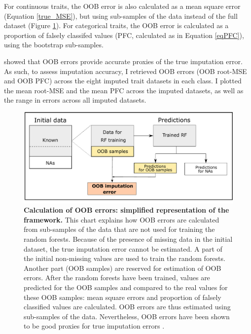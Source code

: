 For continuous traits, the OOB error is also calculated as a mean square error (Equation \ref{true_MSE}), but using sub-samples of the data instead of the full dataset (Figure \ref{OOBerrors_chart}). For categorical traits, the OOB error is calculated as a proportion of falsely classifed values (PFC, calculated as in Equation \ref{eqPFC}), using the bootstrap sub-samples. 

\citet{Breiman2001} showed that OOB errors provide accurate proxies of the true imputation error. As such, to assess imputation accuracy, I retrieved OOB errors (OOB root-MSE and OOB PFC) across the eight imputed trait datasets in each class. I plotted the mean root-MSE and the mean PFC across the imputed datasets, as well as the range in errors across all imputed datasets.

\begin{figure}[h!]
\centering
\includegraphics[scale=0.6]{figures/chapter2/OOBerror/OOB_error_chart}
\caption[Calculation of OOB errors: simplified representation of the framework]{\textbf{Calculation of OOB errors: simplified representation of the  framework.} This chart explains how OOB errors are calculated from sub-samples of the data that are not used for training the random forests. Because of the presence of missing data in the initial dataset, the true imputation error cannot be estimated. A part of the initial non-missing values are used to train the random forests. Another part (OOB samples) are reserved for estimation of OOB errors. After the random forests have been trained, values are predicted for the OOB samples and compared to the real values for these OOB samples: mean square errors and proportion of falsely classified values are calculated. OOB errors are thus estimated using sub-samples of the data. Nevertheless, OOB errors have been shown to be good proxies for true imputation errors \citep{Breiman2001}.}
\label{OOBerrors_chart}
\end{figure}

